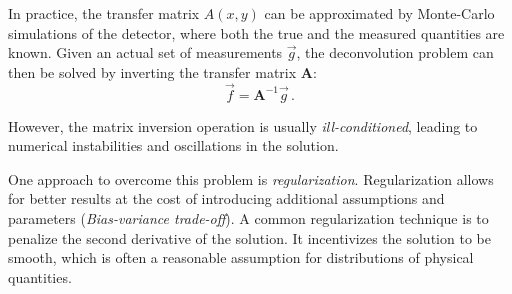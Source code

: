 In practice,
the transfer matrix $A(x, y)$ can be approximated
by Monte-Carlo simulations of the detector,
  where both the true and the measured quantities are known.
Given an actual set of measurements $\vec{g}$,
the deconvolution problem can then be solved
by inverting the transfer matrix $\symbf{A}$:
\begin{equation}
  \label{eq:deconvolution_problem:discretized:inverse}
  \vec{f} = \symbf{A}^{-1} \vec{g} \, .
\end{equation}

However,
the matrix inversion operation is usually \emph{ill-conditioned},
  leading to numerical instabilities
  and oscillations in the solution.


One approach to overcome this problem
is \emph{regularization}.
Regularization allows for better results
  at the cost of introducing additional assumptions and parameters
    (\emph{Bias-variance trade-off}).
A common regularization technique
  is to penalize the second derivative of the solution.
It incentivizes the solution to be smooth,
  which is often a reasonable assumption for distributions of physical quantities.


